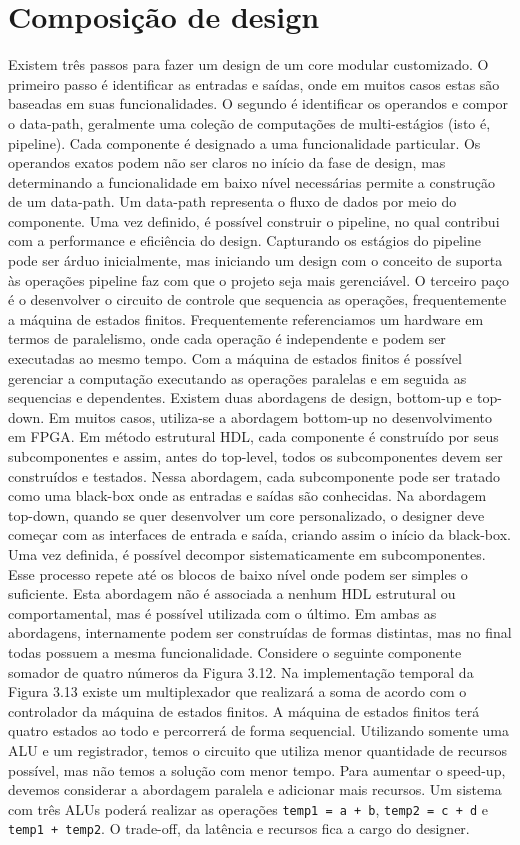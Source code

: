 \section{Composição de design}
Existem três passos para fazer um design de um core modular customizado. O primeiro passo é identificar as entradas e saídas, onde em muitos casos estas são baseadas em suas funcionalidades. O segundo é identificar os operandos e compor o data-path, geralmente uma coleção de computações de multi-estágios (isto é, pipeline). Cada componente é designado a uma funcionalidade particular. Os operandos exatos podem não ser claros no início da fase de design, mas determinando a funcionalidade em baixo nível necessárias permite a construção de um data-path. Um data-path representa o fluxo de dados por meio do componente. Uma vez definido, é possível construir o pipeline, no qual contribui com a performance e eficiência do design. Capturando os estágios do pipeline pode ser árduo inicialmente, mas iniciando um design com o conceito de suporta às operações pipeline faz com que o projeto seja mais gerenciável. O terceiro paço é o desenvolver o circuito de controle que sequencia as operações, frequentemente a máquina de estados finitos. Frequentemente referenciamos um hardware em termos de paralelismo, onde cada operação é independente e podem ser executadas ao mesmo tempo. Com a máquina de estados finitos é possível gerenciar a computação executando as operações paralelas e em seguida as sequencias e dependentes.
Existem duas abordagens de design, bottom-up e top-down. Em muitos casos, utiliza-se a abordagem bottom-up no desenvolvimento em FPGA. Em método estrutural HDL, cada componente é construído por seus subcomponentes e assim, antes do top-level, todos os subcomponentes devem ser construídos e testados. Nessa abordagem, cada subcomponente pode ser tratado como uma black-box onde as entradas e saídas são conhecidas. Na abordagem top-down, quando se quer desenvolver um core personalizado, o designer deve começar com as interfaces de entrada e saída, criando assim o início da black-box. Uma vez definida, é possível decompor sistematicamente em subcomponentes. Esse processo repete até os blocos de baixo nível onde podem ser simples o suficiente. Esta abordagem não é associada a nenhum HDL estrutural ou comportamental, mas é possível utilizada com o último.
Em ambas as abordagens, internamente podem ser construídas de formas distintas, mas no final todas possuem a mesma funcionalidade. Considere o seguinte componente somador de quatro números da Figura 3.12. Na implementação temporal da Figura 3.13 existe um multiplexador que realizará a soma de acordo com o controlador da máquina de estados finitos. A máquina de estados finitos terá quatro estados ao todo e percorrerá de forma sequencial. Utilizando somente uma ALU e um registrador, temos o circuito que utiliza menor quantidade de recursos possível, mas não temos a solução com menor tempo. Para aumentar o speed-up, devemos considerar a abordagem paralela e adicionar mais recursos. Um sistema com três ALUs poderá realizar as operações \texttt{temp1 = a + b}, \texttt{temp2 = c + d} e \texttt{temp1 + temp2}. O trade-off, da latência e recursos fica a cargo do designer.
